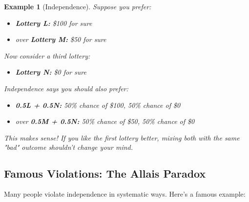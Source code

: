 \documentclass[12pt]{article}
\newtheorem{example}{Example}
\begin{document}
\begin{example}[Independence]
Suppose you prefer:
\begin{itemize}
\item \textbf{Lottery L:} \$100 for sure
\item over \textbf{Lottery M:} \$50 for sure
\end{itemize}

Now consider a third lottery:
\begin{itemize}
\item \textbf{Lottery N:} \$0 for sure
\end{itemize}

Independence says you should also prefer:
\begin{itemize}
\item \textbf{0.5L + 0.5N:} 50\% chance of \$100, 50\% chance of \$0
\item over \textbf{0.5M + 0.5N:} 50\% chance of \$50, 50\% chance of \$0
\end{itemize}

This makes sense! If you like the first lottery better, mixing both with the same "bad" outcome shouldn't change your mind.
\end{example}

\newpage

\subsection{Famous Violations: The Allais Paradox}

Many people violate independence in systematic ways. Here's a famous example:
\end{document}
